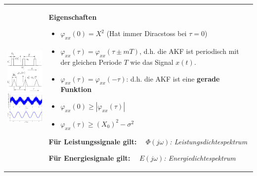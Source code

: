 		\begin{tabularx}{\textwidth}{lX}
		\parbox{6cm}{
			\includegraphics[width=4cm]{./bilder/akf1.png}\\
			\includegraphics[width=4cm]{./bilder/akf2.png}
		} 
		&
		\parbox{12cm}{
			\textbf{Eigenschaften}
			\begin{itemize}
     			\item $\varphi_{xx}(0) = X^2$ (Hat immer Diracstoss bei $\tau = 0$)
     			\item $\varphi_{xx}(\tau)=\varphi_{xx}(\tau\pm mT)$, d.h. die AKF
     				ist periodisch mit der gleichen Periode $T$ wie das Signal $x(t)$.
				\item $\varphi_{xx}(\tau)=\varphi_{xx}(-\tau)$: d.h. die AKF ist eine {\bf gerade Funktion}
				\item $\varphi_{xx}(0)\geq|\varphi_{xx}(\tau)|\quad$
				\item $\varphi_{xx}(\tau)\geq (X_0)^2-\sigma^2\quad$
   			\end{itemize}
   			
   			\textbf{Für Leistungssignale gilt:} \ \ \textit{$\Phi(j\omega)$: Leistungsdichtespektrum} \\
   			\\
						
			\textbf{Für Energiesignale gilt:} \ \ \textit{$E(j\omega)$: Energiedichtespektrum} \\
   			\\
   
}
\end{tabularx}
